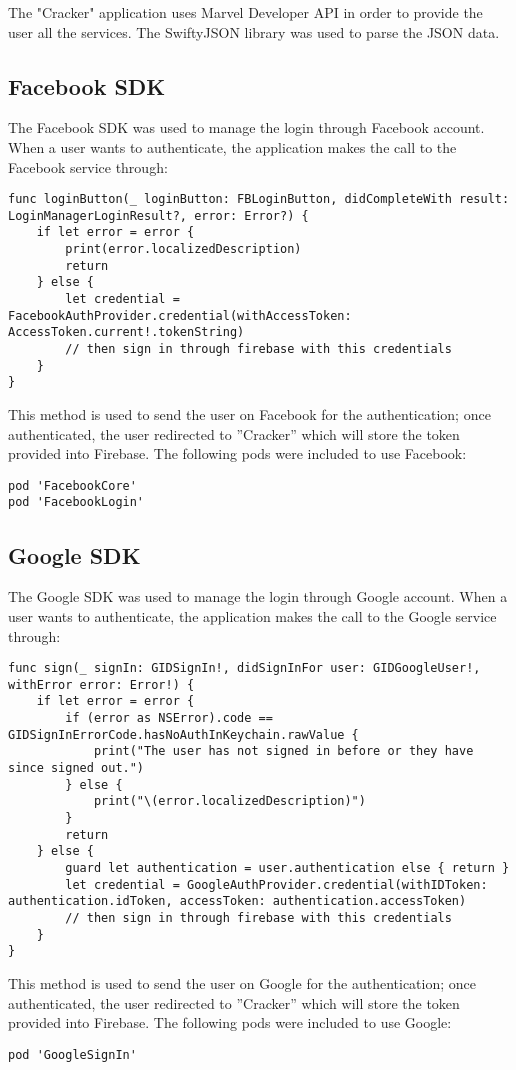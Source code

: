 The "Cracker" application uses Marvel Developer API in order to provide the user all the services. The SwiftyJSON library was used to parse the JSON data.

\vspace{8mm}

\subsection{Facebook SDK}
The Facebook SDK was used to manage the login through Facebook account. When a user wants to authenticate, the application makes the call to the Facebook service through:
\begin{lstlisting}
func loginButton(_ loginButton: FBLoginButton, didCompleteWith result: LoginManagerLoginResult?, error: Error?) {
	if let error = error {
		print(error.localizedDescription)
		return
	} else {
		let credential = FacebookAuthProvider.credential(withAccessToken: AccessToken.current!.tokenString)
		// then sign in through firebase with this credentials
	} 
}
\end{lstlisting}

This method is used to send the user on Facebook for the authentication; once authenticated, the user redirected to ”Cracker” which will store the token provided into Firebase.
The following pods were included to use Facebook:

\begin{lstlisting}
pod 'FacebookCore'
pod 'FacebookLogin'
\end{lstlisting}

\clearpage
  
  
\subsection{Google SDK}
The Google SDK was used to manage the login through Google account. When a user wants to authenticate, the application makes the call to the Google service through:
\begin{lstlisting}
func sign(_ signIn: GIDSignIn!, didSignInFor user: GIDGoogleUser!, withError error: Error!) {
	if let error = error {
		if (error as NSError).code == GIDSignInErrorCode.hasNoAuthInKeychain.rawValue {
			print("The user has not signed in before or they have since signed out.")
		} else {
			print("\(error.localizedDescription)")
		}
		return
	} else {
		guard let authentication = user.authentication else { return }
		let credential = GoogleAuthProvider.credential(withIDToken: authentication.idToken, accessToken: authentication.accessToken)
		// then sign in through firebase with this credentials
	}
}
\end{lstlisting}
This method is used to send the user on Google for the authentication; once authenticated, the user redirected to ”Cracker” which will store the token provided into Firebase.
The following pods were included to use Google:
\begin{lstlisting}
pod 'GoogleSignIn'
\end{lstlisting}
    
